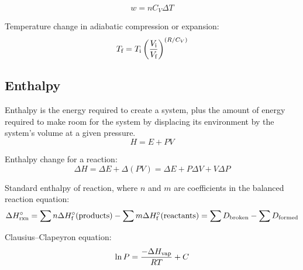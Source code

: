 \documentclass[10pt]{article}
\begin{document}
\begin{equation*}
w = nC_V\Delta T
\end{equation*}

Temperature change in adiabatic compression or expansion:
\begin{equation*}
T_\textnormal{f} = T_\textnormal{i}\left(\frac{V_\textnormal{i}}{V_\textnormal{f}}\right)^{(R/C_V)}
\end{equation*}



\vspace*{0.5cm}
\subsection{Enthalpy}

Enthalpy is the energy required to create a system, plus the amount of energy required to make room for the system by displacing its environment by the system's volume at a given pressure.
\begin{equation*}
H = E + PV
\end{equation*}

Enthalpy change for a reaction:
\begin{equation*}
\Delta H = \Delta E + \Delta(PV) = \Delta E + P\Delta V + V\Delta P
\end{equation*}

Standard enthalpy of reaction, where $n$ and $m$ are coefficients in the balanced reaction equation:
\begin{equation*}
\Delta H\not_\textnormal{rxn} = \sum{n\Delta H\not_\textnormal{f}(\textnormal{products})}-\sum{m\Delta H\not_\textnormal{f}(\textnormal{reactants})} = \sum{D_\textnormal{broken}} - \sum{D_\textnormal{formed}} 
\end{equation*}

Clausius--Clapeyron equation:
\begin{equation*}
\ln P = \frac{-\Delta H_\textnormal{vap}}{RT}+C
\end{equation*}
\end{document}
